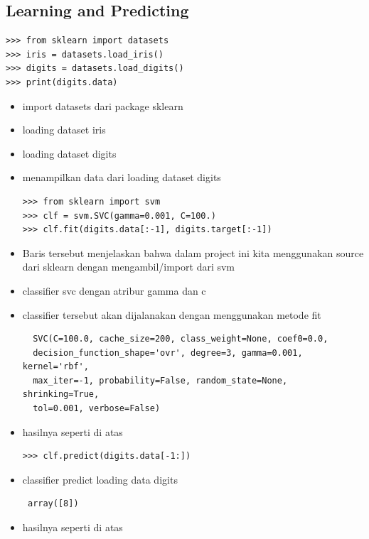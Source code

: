 \subsection{Learning and Predicting}
\begin{verbatim}
>>> from sklearn import datasets
>>> iris = datasets.load_iris()
>>> digits = datasets.load_digits()
>>> print(digits.data)
\end{verbatim}
\begin{itemize}
\item import datasets dari package sklearn
\item loading dataset iris
\item loading dataset digits
\item menampilkan data dari loading dataset digits
\begin{verbatim}
>>> from sklearn import svm
>>> clf = svm.SVC(gamma=0.001, C=100.)
>>> clf.fit(digits.data[:-1], digits.target[:-1])
\end{verbatim}
\item Baris tersebut menjelaskan bahwa dalam project ini kita menggunakan source dari sklearn dengan mengambil/import dari svm
\item classifier svc dengan atribur gamma dan c
\item classifier tersebut akan dijalanakan dengan menggunakan metode fit
\begin{verbatim}
  SVC(C=100.0, cache_size=200, class_weight=None, coef0=0.0,
  decision_function_shape='ovr', degree=3, gamma=0.001, kernel='rbf',
  max_iter=-1, probability=False, random_state=None, shrinking=True,
  tol=0.001, verbose=False)
\end{verbatim}
\item hasilnya seperti di atas
\begin{verbatim}
>>> clf.predict(digits.data[-1:])
\end{verbatim}
\item classifier predict loading data digits
\begin{verbatim}
 array([8])
\end{verbatim}
\item hasilnya seperti di atas
\end{itemize}

